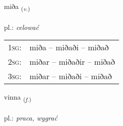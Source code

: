 \documentclass[frontgrid, backgrid]{flacards}\usepackage[]{graphicx}\usepackage[]{xcolor}
\begin{document}
\renewcommand{\flhead}{\vskip5pt \fboxsep=0pt {\small\bfseries\footnotesize Sagnorð | czasownik}}
\renewcommand{\fcfoot}{\vskip5pt \fboxsep=0pt \hspace{2pt}{\small\bfseries\footnotesize 1K}}

\renewcommand{\blhead}{\vskip5pt {\small\bfseries\footnotesize Sagnorð | czasownik }}
\renewcommand{\bcfoot}{\vskip5pt \hspace{2pt}{\small\bfseries\footnotesize 1K}}


{miða \small{\textsubscript{(\textit{v.})}} \\[1ex] %
\textphonetic{[mɪːða]} \\
pl.: \emph{celować} \\  [2ex]
\renewcommand*{\arraystretch}{0.8}
\begin{tabular}{p{1cm}l}
\textsc{1sg}: & miða -- miðaði -- miðað \\ 
\textsc{2sg}: & miðar -- miðaðir -- miðað \\ 
\textsc{3sg}: & miðar -- miðaði -- miðað \\ 
\end{tabular}
}

\renewcommand{\flhead}{\vskip5pt \fboxsep=0pt {\small\bfseries\footnotesize Nafnorð | rzeczownik}}
\renewcommand{\fcfoot}{\vskip5pt \fboxsep=0pt \hspace{2pt}{\small\bfseries\footnotesize 1K}}

\renewcommand{\blhead}{\vskip5pt {\small\bfseries\footnotesize Nafnorð | rzeczownik }}
\renewcommand{\bcfoot}{\vskip5pt \hspace{2pt}{\small\bfseries\footnotesize 1K}}


{vinna \small{\textsubscript{(\textit{f.})}} \\[1ex] %
\textphonetic{[vɪna]} \\
pl.: \emph{praca, wygrać} \\  [2ex]
\renewcommand*{\arraystretch}{0.8}
}
\end{document}
